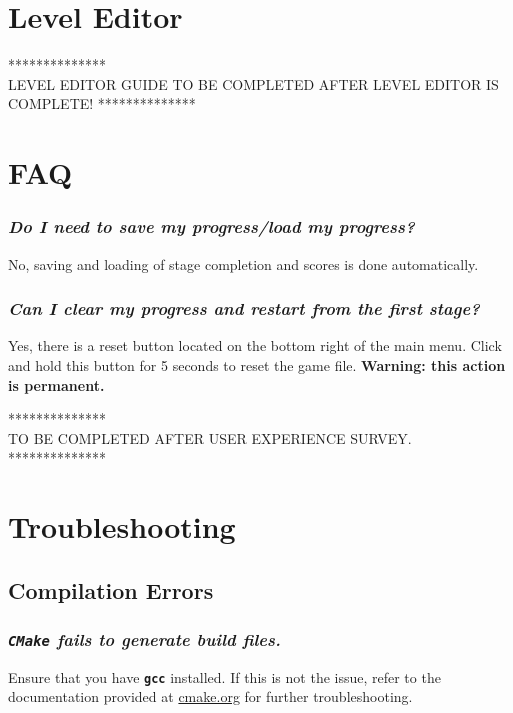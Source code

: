 \documentclass[12pt, titlepage]{article}
\begin{document}
\section{Level Editor}
\label{sec:edit}
{\center ***************\\}
\noindent LEVEL EDITOR GUIDE TO BE COMPLETED AFTER LEVEL EDITOR IS COMPLETE!
{\center ***************\\}

\section{FAQ}


\label{sec:faq}

\subsubsection{\emph{Do I need to save my progress/load my progress?}}
\noindent No, saving and loading of stage completion and scores is done automatically.

\subsubsection{\emph{Can I clear my progress and restart from the first stage?}}
\noindent Yes, there is a reset button located on the bottom right of the main menu.  Click and hold this button for 5 seconds to reset the game file.  {\bf Warning: this action is permanent.}


{\center ***************\\}
\noindent TO BE COMPLETED AFTER USER EXPERIENCE SURVEY.
{\center ***************\\}

\section{Troubleshooting}
\label{sec:trouble}
\subsection{Compilation Errors}
\subsubsection{\emph{\texttt{CMake} fails to generate build files.}}
\noindent Ensure that you have \texttt{\bf gcc} installed.  If this is not the issue, refer to the documentation provided at \href{http://www.cmake.org}{cmake.org} for further troubleshooting.
\end{document}

